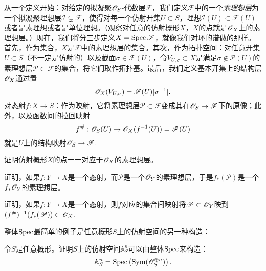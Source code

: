 从一个定义开始：对给定的拟凝聚$\mathscr{O}_S$-代数层$\mathscr F$，我们定义$\mathscr F$中的一个\textit{素理想层}为一个拟凝聚理想层$\mathscr I \subsetneq \mathscr F$，使得对每一个仿射开集$U\subset S$，理想$\mathscr I(U)\subset \mathscr F(U)$或者是素理想或者是单位理想。（观察对任意的仿射概形$X$，$X$的点就是$\mathscr{O}_X$上的素理想层。）现在，我们将分三步定义$X=\operatorname{Spec} \mathscr F$，就像我们对环的谱做的那样。首先，作为集合，$X$是$\mathscr F$中的素理想层的集合。其次，作为拓扑空间：对任意开集$U\subset S$（不一定是仿射的）以及截面$\sigma \in \mathscr F(U)$，令$V_{U,\sigma}\subset X$是满足$\sigma\not\in \mathscr P(U)$的素理想层$\mathscr P \subset \mathscr F$的集合，将它们取作拓扑基。最后，我们定义基本开集上的结构层$\mathscr{O}_X$通过置
\[
	\mathscr{O}_X(V_{U,\sigma})=\mathscr F(U)[\sigma^{-1}].
\]
对态射$f:X\to S$：作为映射，它将素理想层$\mathscr P\subset \mathscr F$变成其在$\mathscr{O}_S\to \mathscr F$下的原像；此外，以及函数间的拉回映射
\[
	f^\#:\mathscr{O}_S(U)\to \mathscr{O}_X(f^{-1}(U))=\mathscr F(U)
\]
就是$U$上的结构映射$\mathscr{O}_S\to \mathscr F$.

\begin{exe}\label{exe:1.51}
证明仿射概形$X$的点一一对应于$\mathscr{O}_X$的素理想层。
\end{exe}

\begin{exe}\label{exe:1.52}
证明，如果$f:Y\to X$是一个态射，而$\mathscr P$是一个$\mathscr{O}_Y$的素理想层，于是$f_*(\mathscr P)$是一个$f_*\mathscr{O}_Y$的素理想层。
\end{exe}

\begin{exe}\label{exe:1.53}
证明，如果$f:Y\to X$是一个态射，则$f$对应的集合间映射将$\mathscr P\subset \mathscr{O}_Y$映到$(f^\#)^{-1}(f_*(\mathscr P))\subset \mathscr{O}_X$.
\end{exe}

整体$\operatorname{Spec}$最简单的例子是任意概形$S$上的仿射空间的另一种构造：

\begin{exe}\label{exe:1.54}
令$S$是任意概形。证明$S$上的仿射空间$\mathbb A^n_S$可以由整体$\operatorname{Spec}$来构造：
\[
	\mathbb A^n_S=\operatorname{Spec} \left(\mathrm{Sym}(\mathscr{O}_S^{\oplus n})\right).
\]
\end{exe}